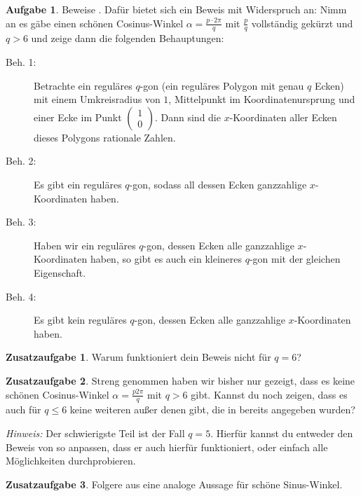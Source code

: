 \documentclass[a4paper,ngerman,12pt]{scrartcl}
\theoremstyle{definition}
\newtheorem{aufg}{Aufgabe}
\newtheorem{zaufg}{Zusatzaufgabe}
\theoremstyle{plain}
\theoremstyle{remark}
\begin{document}
\begin{aufg}
	Beweise . Dafür bietet sich ein Beweis mit Widerspruch an: Nimm an es gäbe einen schönen Cosinus-Winkel $\alpha=\tfrac{p\cdot 2\pi}{q}$ mit $\frac{p}{q}$ vollständig gekürzt und $q > 6$ und zeige dann die folgenden Behauptungen:
	\begin{description}
		\item[Beh. 1:] Betrachte ein reguläres $q$-gon (ein reguläres Polygon mit genau $q$ Ecken) mit einem Umkreisradius von $1$, Mittelpunkt im Koordinatenursprung und einer Ecke im Punkt $\begin{pmatrix}1\\0\end{pmatrix}$. Dann sind die $x$-Koordinaten aller Ecken dieses Polygons rationale Zahlen.
		\item[Beh. 2:] Es gibt ein reguläres $q$-gon, sodass all dessen Ecken ganzzahlige $x$-Koordinaten haben.
		\item[Beh. 3:] Haben wir ein reguläres $q$-gon, dessen Ecken alle ganzzahlige $x$-Koordinaten haben, so gibt es auch ein kleineres $q$-gon mit der gleichen Eigenschaft.
		\item[Beh. 4:] Es gibt kein reguläres $q$-gon, dessen Ecken alle ganzzahlige $x$-Koordinaten haben.
	\end{description}
\end{aufg}

\begin{zaufg}
	Warum funktioniert dein Beweis nicht für $q=6$?
\end{zaufg}

\begin{zaufg}
	Streng genommen haben wir bisher nur gezeigt, dass es keine schönen Cosinus-Winkel $\alpha=\tfrac{p2\pi}{q}$ mit $q > 6$ gibt. Kannst du noch zeigen, dass es auch für $q \leq 6$ keine weiteren außer denen gibt, die in  bereits angegeben wurden?
	
	\textit{Hinweis:} Der schwierigste Teil ist der Fall $q=5$. Hierfür kannst du entweder den Beweis von  so anpassen, dass er auch hierfür funktioniert, oder einfach alle Möglichkeiten durchprobieren.
\end{zaufg}

\begin{zaufg}
	Folgere aus  eine analoge Aussage für schöne Sinus-Winkel.
\end{zaufg}
\end{document}
